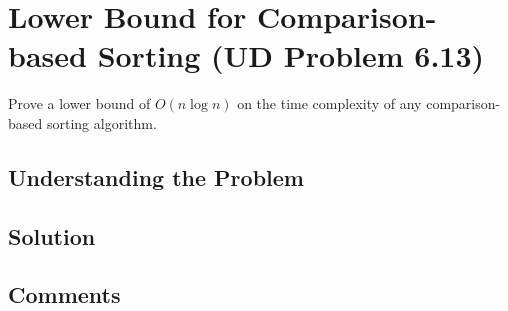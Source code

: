 
\section{Lower Bound for Comparison-based Sorting (UD Problem 6.13)}

Prove a lower bound of $O(n \log n)$ on the time complexity of any comparison-based sorting algorithm.

\subsection{Understanding the Problem}

\subsection{Solution}

\subsection{Comments}
